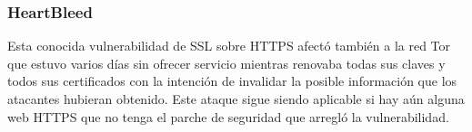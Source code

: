 \subsubsection{HeartBleed}
Esta conocida vulnerabilidad de SSL sobre HTTPS afectó también a la red Tor que estuvo varios días sin ofrecer servicio mientras renovaba todas sus claves y todos sus certificados con la intención de invalidar la posible información que los atacantes hubieran obtenido. Este ataque sigue siendo aplicable si hay aún alguna web HTTPS que no tenga el parche de seguridad que arregló la vulnerabilidad.